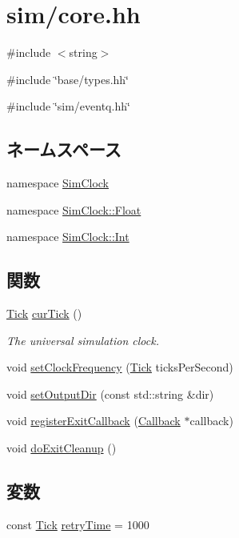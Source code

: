 \hypertarget{core_8hh}{
\section{sim/core.hh}
\label{core_8hh}
}
{\ttfamily \#include $<$string$>$}\par
{\ttfamily \#include \char`\"{}base/types.hh\char`\"{}}\par
{\ttfamily \#include \char`\"{}sim/eventq.hh\char`\"{}}\par
\subsection*{ネームスペース}
\begin{DoxyCompactItemize}
\item 
namespace \hyperlink{namespaceSimClock}{SimClock}
\item 
namespace \hyperlink{namespaceSimClock_1_1Float}{SimClock::Float}
\item 
namespace \hyperlink{namespaceSimClock_1_1Int}{SimClock::Int}
\end{DoxyCompactItemize}
\subsection*{関数}
\begin{DoxyCompactItemize}
\item 
\hyperlink{base_2types_8hh_a5c8ed81b7d238c9083e1037ba6d61643}{Tick} \hyperlink{core_8hh_a7acdccbf0d35ce0c159c0cdd36371b22}{curTick} ()
\begin{DoxyCompactList}\small\item\em The universal simulation clock. \item\end{DoxyCompactList}\item 
void \hyperlink{core_8hh_a563bf37014962b47bb575473a2d75d93}{setClockFrequency} (\hyperlink{base_2types_8hh_a5c8ed81b7d238c9083e1037ba6d61643}{Tick} ticksPerSecond)
\item 
void \hyperlink{core_8hh_afd5c60b871e1d4bea62db33e251fb9fd}{setOutputDir} (const std::string \&dir)
\item 
void \hyperlink{core_8hh_acbc78ce26c7964097d562909c589d585}{registerExitCallback} (\hyperlink{classCallback}{Callback} $\ast$callback)
\item 
void \hyperlink{core_8hh_a77e16fe0c066fb9cde89cf37cfe3d2c7}{doExitCleanup} ()
\end{DoxyCompactItemize}
\subsection*{変数}
\begin{DoxyCompactItemize}
\item 
const \hyperlink{base_2types_8hh_a5c8ed81b7d238c9083e1037ba6d61643}{Tick} \hyperlink{core_8hh_aabf2ecba12e5e7712c4926d64bd10b46}{retryTime} = 1000
\end{DoxyCompactItemize}


